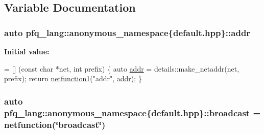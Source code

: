 \subsection{Variable Documentation}
\hypertarget{namespacepfq__lang_1_1anonymous__namespace_02default_8hpp_03_aafce8334d1be83bff9a2115439c8c453}{
\subsubsection[{addr}]{\setlength{\rightskip}{0pt plus 5cm}auto pfq\-\_\-lang\-::anonymous\-\_\-namespace\{default.\-hpp\}\-::addr}}\label{namespacepfq__lang_1_1anonymous__namespace_02default_8hpp_03_aafce8334d1be83bff9a2115439c8c453}
{\bfseries Initial value\-:}
\begin{DoxyCode}
= [] (\textcolor{keyword}{const} \textcolor{keywordtype}{char} *net, \textcolor{keywordtype}{int} prefix)
        \{
            \textcolor{keyword}{auto} \hyperlink{namespacepfq__lang_1_1anonymous__namespace_02default_8hpp_03_aafce8334d1be83bff9a2115439c8c453}{addr} = details::make\_netaddr(net, prefix);
            \textcolor{keywordflow}{return} \hyperlink{namespacepfq__lang_af215f25fa7ebd61fdc90cf0ef78a3164}{netfunction1}(\textcolor{stringliteral}{"addr"}, \hyperlink{namespacepfq__lang_1_1anonymous__namespace_02default_8hpp_03_aafce8334d1be83bff9a2115439c8c453}{addr});
        \}
\end{DoxyCode}
\hypertarget{namespacepfq__lang_1_1anonymous__namespace_02default_8hpp_03_a3b7dd001dfb2302c93212313c0bfa82a}{
\subsubsection[{broadcast}]{\setlength{\rightskip}{0pt plus 5cm}auto pfq\-\_\-lang\-::anonymous\-\_\-namespace\{default.\-hpp\}\-::broadcast = {\bf netfunction}(\char`\"{}broadcast\char`\"{})}}\label{namespacepfq__lang_1_1anonymous__namespace_02default_8hpp_03_a3b7dd001dfb2302c93212313c0bfa82a}

